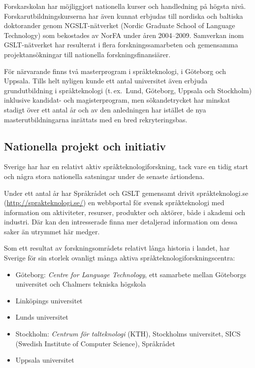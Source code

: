 \begin{multicols}{2}
Forskarskolan har
möjliggjort nationella kurser och handledning på högsta
nivå. Forskarutbildningskurserna har även kunnat erbjudas till
nordiska och baltiska doktorander genom NGSLT-nätverket (Nordic
Graduate School of Language Technology) som bekostades av NorFA under
åren 2004--2009. Samverkan inom GSLT-nätverket har resulterat i flera
forskningssamarbeten och gemensamma projektansökningar till nationella
forskningsfinansiärer.

För närvarande finns två masterprogram i språkteknologi, i Göteborg
och Uppsala. Tills helt nyligen kunde ett antal universitet även
erbjuda grundutbildning i språkteknologi (t.\,ex.~Lund, Göteborg,
Uppsala och Stockholm) inklusive kandidat- och magisterprogram, men
sökandetrycket har minskat stadigt över ett antal år och av den
anledningen har istället de nya masterutbildningarna inrättats med en
bred rekryteringsbas.


\subsection{Nationella projekt och initiativ}

Sverige har har en relativt aktiv språkteknologiforskning, tack vare
en tidig start och några stora nationella satsningar under de senaste
årtiondena.

Under ett antal år har Språkrådet och GSLT gemensamt drivit
språkteknologi.se (\url{http://sprakteknologi.se/}) en webbportal för
svensk språkteknologi med information om aktivi\-teter, resurser,
produkter och aktörer, både i akademi och industri. Där kan den
intresserade finna mer detaljerad information om dessa saker än
utrymmet här medger.

Som ett resultat av forskningsområdets relativt långa historia i
landet, har Sverige för sin storlek ovanligt många aktiva
språk\-tekno\-logi\-forsknings\-centra:

\begin{itemize}
\item Göteborg: \emph{Centre for Language Technology}, ett samarbete mellan Göteborgs universitet och Chalmers tekniska högskola
\item Linköpings universitet
\item Lunds universitet
\item Stockholm: \emph{Centrum för talteknologi} (KTH), Stockholms universitet, SICS (Swedish Institute of Computer Science), Språkrådet
\item Uppsala universitet
\end{itemize}



\end{multicols}

